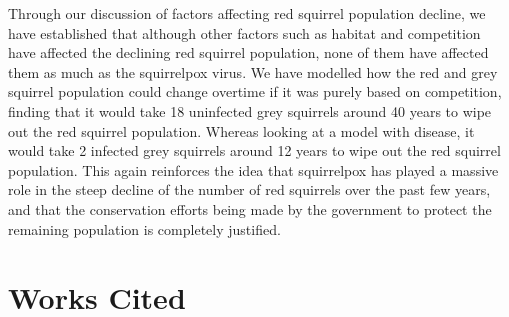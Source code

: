 \documentclass{article}
\begin{document}
Through our discussion of factors affecting red squirrel population decline, we have established that although other factors such as habitat and competition have affected the declining red squirrel population, none of them have affected them as much as the squirrelpox virus. We have modelled how the red and grey squirrel population could change overtime if it was purely based on competition, finding that it would take 18 uninfected grey squirrels around 40 years to wipe out the red squirrel population. Whereas looking at a model with disease, it would take 2 infected grey squirrels around 12 years to wipe out the red squirrel population. This again reinforces the idea that squirrelpox has played a massive role in the steep decline of the number of red squirrels over the past few years, and that the conservation efforts being made by the government to protect the remaining population is completely justified.




\section{Works Cited}
\end{document}
